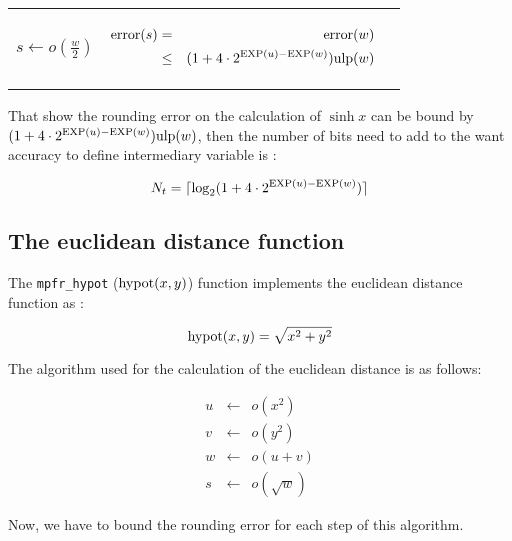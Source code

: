 \documentclass[12pt]{amsart}
\def\ulp{{\rm ulp}}
\def\exp{{\rm EXP}}
\begin{document}
\begin{center}
\begin{tabular}{l|l |l}
\begin{minipage}{2.5cm}
$s \leftarrow o(\frac{w}{2}) $
\end{minipage} &
\begin{minipage}{7.5cm}

\begin{center}


\begin{eqnarray}\nonumber
 {\textnormal{error}}(s) & = &  {\textnormal{error}}(w)\\\nonumber
 & \leq &  (1+ 4 \cdot 2^{\exp(u)-\exp(w)}) \ulp(w)
\end{eqnarray}



\end{center}

\end{minipage} &
\begin{minipage}{6cm}


\end{minipage}


\end{tabular}
\end{center}


That show the rounding error on the calculation of $\sinh x$ can be bound by $(1+ 4 \cdot 2^{\exp(u)-\exp(w)}) \ulp(w)$, then the number of bits need to add to the want accuracy to define intermediary variable is :

\[
N_t=\lceil \log_2(1+ 4 \cdot 2^{\exp(u)-\exp(w)}) \rceil
\]



\subsection{The euclidean distance function}

The {\tt mpfr\_hypot} ($\textnormal{hypot}(x,y)$) function implements the euclidean distance function  as :

\[
\textnormal{hypot} (x,y) = \sqrt{x^2+y^2}
\]

The algorithm used for the calculation of the euclidean distance is as follows:

\begin{eqnarray}\nonumber
u&\leftarrow&o(x^2)\\\nonumber
v&\leftarrow&o({y}^{2})\\\nonumber
w&\leftarrow&o(u+v)\\\nonumber
s&\leftarrow&o(\sqrt{w})
\end{eqnarray}

Now, we have to bound the rounding error for each step of this
algorithm.  
\end{document}
